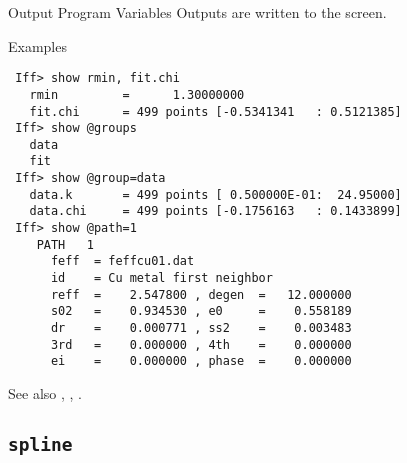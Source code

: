 \begin{IFFcom}
\item[Output Program Variables] Outputs are written to the screen.
\item[Examples] {\hspace{1.in} \vspace{-0.1truein} \relax }
\begin{verbatim} 
 Iff> show rmin, fit.chi
   rmin         =      1.30000000
   fit.chi      = 499 points [-0.5341341   : 0.5121385]
 Iff> show @groups
   data
   fit
 Iff> show @group=data   
   data.k       = 499 points [ 0.500000E-01:  24.95000]
   data.chi     = 499 points [-0.1756163   : 0.1433899]
 Iff> show @path=1
    PATH   1
      feff  = feffcu01.dat
      id    = Cu metal first neighbor
      reff  =    2.547800 , degen  =   12.000000
      s02   =    0.934530 , e0     =    0.558189
      dr    =    0.000771 , ss2    =    0.003483
      3rd   =    0.000000 , 4th    =    0.000000
      ei    =    0.000000 , phase  =    0.000000
\end{verbatim} \noindent %
\item[See also] {}, {}, {}.
\end{IFFcom}



\relax\par\vfill
\subsection{\texttt{spline}}
       \label{Ch:Command:spline}

